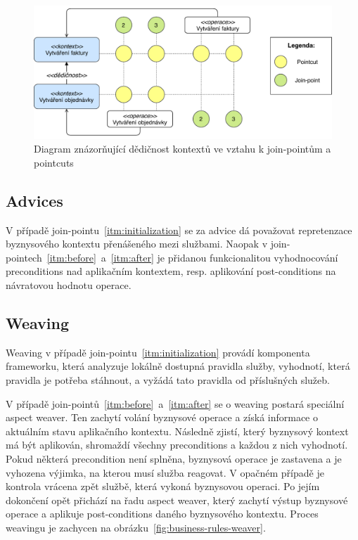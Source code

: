 \begin{figure}
    \centering
    \includegraphics[keepaspectratio=true, width=1\linewidth]{figures/context-extension.pdf}
    \caption{Diagram znázorňující dědičnost kontextů ve vztahu k join-pointům a pointcuts}
    \label{fig:context-extension}
\end{figure}

\subsection{Advices}

V případě join-pointu~\ref{itm:initialization} se za advice dá považovat repretenzace byznysového
kontextu přenášeného mezi službami. Naopak v join-pointech~\ref{itm:before}~a~\ref{itm:after}
je přidanou funkcionalitou vyhodnocování preconditions nad aplikačním kontextem, resp. aplikování
post-conditions na návratovou hodnotu operace.

\subsection{Weaving}

Weaving v případě join-pointu~\ref{itm:initialization} provádí komponenta frameworku, která
analyzuje lokálně dostupná pravidla služby, vyhodnotí, která pravidla je potřeba stáhnout,
a vyžádá tato pravidla od příslušných služeb.

V případě join-pointů~\ref{itm:before}~a~\ref{itm:after} se o weaving postará speciální aspect weaver.
Ten zachytí volání byznysové operace a získá informace o aktuálním stavu aplikačního kontextu.
Následně zjistí, který byznysový kontext má být aplikován, shromaždí všechny preconditions
a každou z nich vyhodnotí. Pokud některá precondition není splněna, byznysová operace je zastavena
a je vyhozena výjimka, na kterou musí služba reagovat. V opačném případě je kontrola vrácena zpět
službě, která vykoná byznysovou operaci. Po jejím dokončení opět přichází na řadu aspect weaver,
který zachytí výstup byznysové operace a aplikuje post-conditions daného byznysového kontextu.
Proces weavingu je zachycen na obrázku~\ref{fig:business-rules-weaver}.

